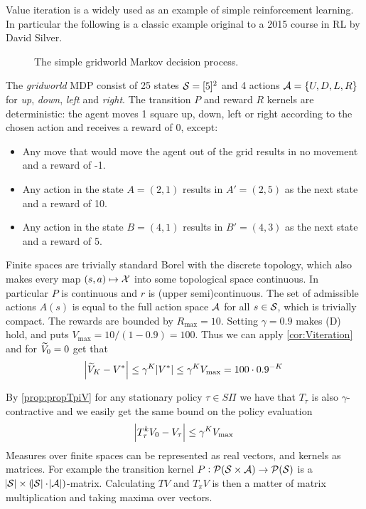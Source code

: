 Value iteration is a widely used as an example of simple
reinforcement learning.
In particular the following is a classic example original to a
2015 course in RL by David Silver.
\begin{example}[Gridworld]
  \begin{figure}[h]
    \centering
    \caption{The simple gridworld Markov decision process.}
  \end{figure}
  The \emph{gridworld} MDP consist of 25 states $\mathcal{S} = [5]^2$ and 4 actions
  $\mathcal{A} = \{U, D, L, R\}$ for \emph{up}, \emph{down}, \emph{left} and 
  \emph{right}. The transition $P$ and reward $R$ kernels are deterministic:
  the agent moves 1 square up, down, left or right according to the chosen
  action and receives a reward of 0, except:
  \begin{itemize}
    \item Any move that would move the
      agent out of the grid results in no movement and a reward of -1.
    \item Any action in the state $A = (2,1)$ results in $A' = (2,5)$ as
      the next state and a reward of 10.
    \item Any action in the state $B = (4,1)$ results in $B' = (4,3)$ as
      the next state and a reward of 5.
  \end{itemize}
  Finite spaces are trivially standard Borel with the discrete topology,
  which also makes every map $(s, a) \mapsto \mathcal{X}$ into some
  topological space continuous. In particular $P$ is continuous and
  $r$ is (upper semi)continuous.
  The set of admissible actions $A(s)$ is equal to the
  full action space $\mathcal{A}$ for all $s \in \mathcal{S}$, which is trivially
  compact.
  The rewards are bounded by $R_{\max} = 10$.
  Setting $\gamma = 0.9$ makes (D) hold, and puts
  $V_{\max} = 10/(1-0.9) = 100$.
  Thus we can apply \cref{cor:Viteration} and for $\widetilde{V}_0 = 0$ get that
  \[ \abs{\widetilde{V}_K - V^*} \leq \gamma^K \abs{V^*}
  \leq \gamma^K V_{\max} = 100 \cdot 0.9^{-K} \]
  
  By \cref{prop:propTpiV} for any stationary policy $\tau \in S\Pi$ we have
  that $T_\tau$ is also $\gamma$-contractive and we
  easily get the same bound on the policy evaluation
  \[ \abs{T_\tau^k V_0 - V_\tau} \leq \gamma^K V_{\max} \]
  Measures over finite spaces can be represented as real vectors,
  and kernels as matrices.
  For example the transition kernel
  $P: \mathcal{P}(\mathcal{S} \times \mathcal{A}) \to \mathcal{P}(\mathcal{S})$
  is a $\abs{\mathcal{S}} \times (\abs{\mathcal{S}} \cdot \abs{\mathcal{A}})$-matrix.
  Calculating $TV$ and $T_\pi V$ is then a matter of matrix multiplication
  and taking maxima over vectors.


\end{example}
